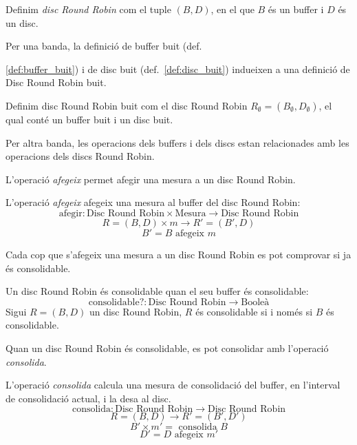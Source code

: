 \begin{definition}
  Definim \emph{disc Round Robin} com el tuple $(B,D)$, en el que $B$
  és un buffer i $D$ és un disc.
\end{definition}
 
Per una banda, la definició de buffer buit (def.~{\ref{def:buffer_buit}) i de disc buit (def.~\ref{def:disc_buit}) indueixen a una definició de Disc Round Robin buit. 

\begin{definition}\label{def:disc_round_robin_buit}
  Definim disc Round Robin buit com el disc Round Robin $R_{\emptyset}
  = (B_{\emptyset},D_{\emptyset})$, el qual conté un buffer buit i un
  disc buit.
\end{definition}

Per altra banda, les operacions dels buffers i dels discs estan relacionades amb les operacions dels discs Round Robin. 

L'operació \emph{afegeix} permet afegir una mesura a un disc Round Robin.

\begin{definition}
  L'operació \emph{afegeix} afegeix una mesura al buffer del disc Round Robin:
  \[
  \text{afegir}: \text{Disc Round Robin} \times \text{Mesura} \longrightarrow \text{Disc Round Robin}
  \]
  \[
  R=(B,D) \times m \longrightarrow R'= (B',D)
  \]
  \[
  B'= B \text{ afegeix } m
  \]
\end{definition}

Cada cop que s'afegeix una mesura a un disc Round Robin es pot comprovar si ja és consolidable. 

\begin{definition}
  Un disc Round Robin és consolidable quan el seu buffer és consolidable:
  \[
  \text{consolidable?}: \text{Disc Round Robin} \longrightarrow \text{Booleà}
  \]
  Sigui $R=(B,D)$ un disc Round Robin, $R$ és consolidable si i només
  si $B$ és consolidable.
\end{definition}


Quan un disc Round Robin és consolidable, es pot consolidar amb l'operació \emph{consolida}. 

\begin{definition}
  L'operació \emph{consolida} calcula una  mesura de consolidació del buffer, en
  l'interval de consolidació actual, i la desa al disc. 
  \[
  \text{consolida}: \text{Disc Round Robin} \longrightarrow \text{Disc Round Robin}
  \]
  \[
  R=(B,D) \longrightarrow R'= (B',D')
  \]
  \[
  B' \times m'= \text{ consolida } B 
  \]
  \[
  D'= D \text{ afegeix } m'
  \]
\end{definition}



}
